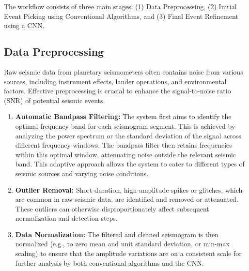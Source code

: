 \documentclass[conference]{IEEEtran}
\begin{document}

The workflow consists of three main stages: (1) Data Preprocessing, (2) Initial Event Picking using Conventional Algorithms, and (3) Final Event Refinement using a CNN.

\subsection{Data Preprocessing}
Raw seismic data from planetary seismometers often contains noise from various sources, including instrument effects, lander operations, and environmental factors. Effective preprocessing is crucial to enhance the signal-to-noise ratio (SNR) of potential seismic events.
\begin{enumerate}
    \item \textbf{Automatic Bandpass Filtering:} The system first aims to identify the optimal frequency band for each seismogram segment. This is achieved by analyzing the power spectrum or the standard deviation of the signal across different frequency windows. The bandpass filter then retains frequencies within this optimal window, attenuating noise outside the relevant seismic band. This adaptive approach allows the system to cater to different types of seismic sources and varying noise conditions.
    \item \textbf{Outlier Removal:} Short-duration, high-amplitude spikes or glitches, which are common in raw seismic data, are identified and removed or attenuated. These outliers can otherwise disproportionately affect subsequent normalization and detection steps.
    \item \textbf{Data Normalization:} The filtered and cleaned seismogram is then normalized (e.g., to zero mean and unit standard deviation, or min-max scaling) to ensure that the amplitude variations are on a consistent scale for further analysis by both conventional algorithms and the CNN.
\end{enumerate}
\end{document}
